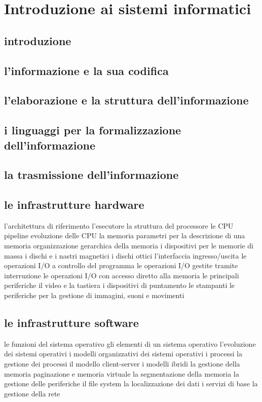 \chapter{Introduzione ai sistemi informatici}
    \section{introduzione}
    \section{l'informazione e la sua codifica}
    \section{l'elaborazione e la struttura dell'informazione}
    \section{i linguaggi per la formalizzazione dell'informazione}
    \section{la trasmissione dell'informazione}
    \section{le infrastrutture hardware}
        l'architettura di riferimento
        l'esecutore
            la struttura del processore
            le CPU pipeline
            evoluzione delle CPU
        la memoria
            parametri per la descrizione di una memoria
            organizzazione gerarchica della memoria
        i dispositivi per le memorie di massa
            i dischi e i nastri magnetici
            i dischi ottici
        l'interfaccia ingresso/uscita
            le operazioni I/O a controllo del programma
            le operazioni I/O gestite tramite interruzione
            le operazioni I/O con accesso diretto alla memoria
        le principali periferiche
            il video e la tastiera
            i dispositivi di puntamento
            le stampanti
            le periferiche per la gestione di immagini, suoni e movimenti
    \section{le infrastrutture software}
        le funzioni del sistema operativo
            gli elementi di un sistema operativo
            l'evoluzione dei sistemi operativi
            i modelli organizzativi dei sistemi operativi
        i processi
            la gestione dei processi
            il modello client-server
            i modelli ibridi
        la gestione della memoria
            paginazione e memoria virtuale
            la segmentazione della memoria
        la gestione delle periferiche
        il file system
            la localizzazione dei dati
            i servizi di base
        la gestione della rete
